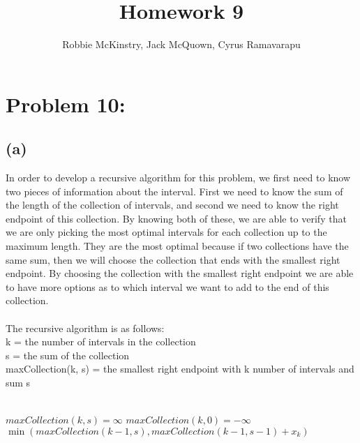\documentclass[12pt]{article}
\begin{document}
\title{Homework 9}
\author{Robbie McKinstry, Jack McQuown, Cyrus Ramavarapu}
\renewcommand{\today}{22 September 2016}
\renewcommand{\baselinestretch}{1.5}
\maketitle

\section*{Problem 10: }
\subsection*{(a)}
In order to develop a recursive algorithm for this problem, we first need to know two pieces of information about the interval. First we need to know the sum of the length of the collection of intervals, and second we need to know the right endpoint of this collection. By knowing both of these, we are able to verify that we are only picking the most optimal intervals for each collection up to the maximum length. They are the most optimal because if two collections have the same sum, then we will choose the collection that ends with the smallest right endpoint. By choosing the collection with the smallest right endpoint we are able to have more options as to which interval we want to add to the end of this collection.\\\\
The recursive algorithm is as follows:\\
k = the number of intervals in the collection\\
s = the sum of the collection\\
maxCollection(k, s) = the smallest right endpoint with k number of intervals and sum s\\
\begin{algorithm}[H]
\Init\\
{
{$maxCollection(k, s) = \infty$}
}
{$maxCollection(k, 0) = -\infty$}
\EndInit\\
{
{
{$\min(maxCollection(k - 1, s), maxCollection(k - 1, s - 1) + x_k)$}
}
}
\end{algorithm}
\end{document}
